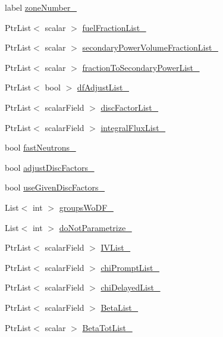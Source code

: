 \begin{DoxyCompactItemize}
label \hyperlink{classFoam_1_1XS_ada6a4a148b99570ba7b0d85af309e381}{zone\+Number\+\_\+}
\item 
Ptr\+List$<$ scalar $>$ \hyperlink{classFoam_1_1XS_a0eed7ae40daff8d8f928a816c03238dc}{fuel\+Fraction\+List\+\_\+}
\item 
Ptr\+List$<$ scalar $>$ \hyperlink{classFoam_1_1XS_a9866d718d7ff6dd34cb5932a6d7a20f4}{secondary\+Power\+Volume\+Fraction\+List\+\_\+}
\item 
Ptr\+List$<$ scalar $>$ \hyperlink{classFoam_1_1XS_af5b51be2f020a92e77d75e81656cb523}{fraction\+To\+Secondary\+Power\+List\+\_\+}
\item 
Ptr\+List$<$ bool $>$ \hyperlink{classFoam_1_1XS_aa1a72609f886403c648b883afd2324d8}{df\+Adjust\+List\+\_\+}
\item 
Ptr\+List$<$ scalar\+Field $>$ \hyperlink{classFoam_1_1XS_ac6878d1b2f43142f73523fef972e86a5}{disc\+Factor\+List\+\_\+}
\item 
Ptr\+List$<$ scalar\+Field $>$ \hyperlink{classFoam_1_1XS_ac55209828437fab67c22579de8659507}{integral\+Flux\+List\+\_\+}
\item 
bool \hyperlink{classFoam_1_1XS_ad36ef1463ce7c1bf8b5b083ad229af93}{fast\+Neutrons\+\_\+}
\item 
bool \hyperlink{classFoam_1_1XS_a995f00ddfa8d7afec0beb58f40044b8e}{adjust\+Disc\+Factors\+\_\+}
\item 
bool \hyperlink{classFoam_1_1XS_af0d46dbd8f4bf0d838e61b1a847b542a}{use\+Given\+Disc\+Factors\+\_\+}
\item 
List$<$ int $>$ \hyperlink{classFoam_1_1XS_af96c29e836fe8fbd52a58c51babc1e49}{groups\+Wo\+D\+F\+\_\+}
\item 
List$<$ int $>$ \hyperlink{classFoam_1_1XS_af530df78adddbde30f97428e0c97515a}{do\+Not\+Parametrize\+\_\+}
\item 
Ptr\+List$<$ scalar\+Field $>$ \hyperlink{classFoam_1_1XS_a19d53fda58dda9527cd576aeb4bb5d80}{I\+V\+List\+\_\+}
\item 
Ptr\+List$<$ scalar\+Field $>$ \hyperlink{classFoam_1_1XS_adea7ad629cca35c92aa378f83e83c538}{chi\+Prompt\+List\+\_\+}
\item 
Ptr\+List$<$ scalar\+Field $>$ \hyperlink{classFoam_1_1XS_a00d7a6e60e7706bef715997006d0ec98}{chi\+Delayed\+List\+\_\+}
\item 
Ptr\+List$<$ scalar\+Field $>$ \hyperlink{classFoam_1_1XS_ac61f3369da634aa67bc96d748b18926f}{Beta\+List\+\_\+}
\item 
Ptr\+List$<$ scalar $>$ \hyperlink{classFoam_1_1XS_a7f082da7ac7d2c42560f7c37b1aa00ea}{Beta\+Tot\+List\+\_\+}

\end{DoxyCompactItemize}
